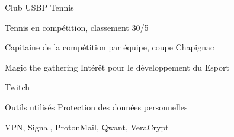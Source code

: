 

\begin{cventries}

  \cventry
    {Club USBP} %
    {Tennis} %
    {} %
    {} %
    {
      \begin{cvitems} %
        \item {Tennis en compétition, classement 30/5}
        \item {Capitaine de la compétition par équipe, coupe Chapignac}
      \end{cvitems}
    }

  \cventry
    {Magic the gathering} %
    {Intérêt pour le développement du Esport} %
    {} %
    {} %
    {
      \begin{cvitems} %
        \item {Twitch}
      \end{cvitems}
    }

  \cventry
    {Outils utilisés} %
    {Protection des données personnelles} %
    {} %
    {} %
    {
      \begin{cvitems} %
        \item {VPN, Signal, ProtonMail, Qwant, VeraCrypt}
      \end{cvitems}
    }

\end{cventries}

